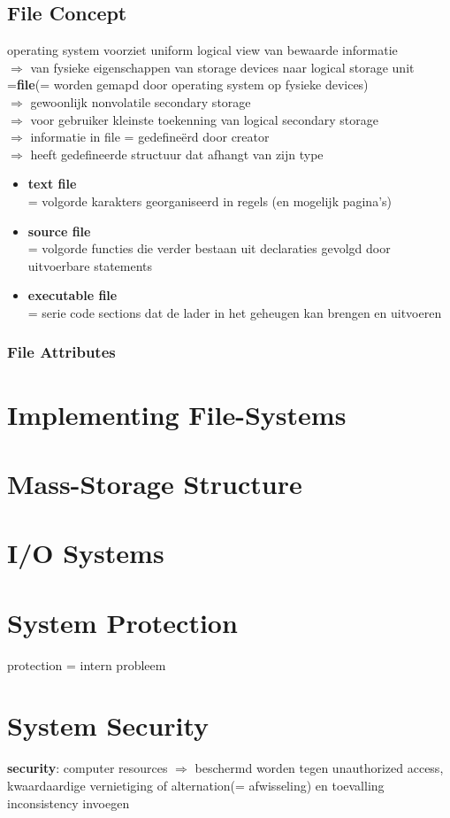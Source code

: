 \documentclass{report}
\begin{document}
\section{File Concept}
operating system voorziet uniform logical view van bewaarde informatie
\\$\Rightarrow$ van fysieke eigenschappen van storage devices naar logical storage unit =\textbf{file}(= worden gemapd door operating system op fysieke devices)
\\$\Rightarrow$ gewoonlijk nonvolatile secondary storage
\\$\Rightarrow$ voor gebruiker kleinste toekenning van logical secondary storage
\\$\Rightarrow$ informatie in file = gedefine\"erd door creator
\\$\Rightarrow$ heeft gedefineerde structuur dat afhangt van zijn type
\begin{itemize}
\item \textbf{text file}
\\= volgorde karakters georganiseerd in regels (en mogelijk pagina's)
\item \textbf{source file}
\\= volgorde functies die verder bestaan uit declaraties gevolgd door uitvoerbare statements
\item \textbf{executable file}
\\= serie code sections dat de lader in het geheugen kan brengen en uitvoeren
\end{itemize}
\subsection{File Attributes}

\chapter{Implementing File-Systems}
\chapter{Mass-Storage Structure}
\chapter{I/O Systems}
\chapter{System Protection}
protection = intern probleem
\chapter{System Security}
\textbf{security}: computer resources $\Rightarrow$ beschermd worden tegen unauthorized access, kwaardaardige vernietiging of alternation(= afwisseling) en toevalling inconsistency invoegen
\end{document}
